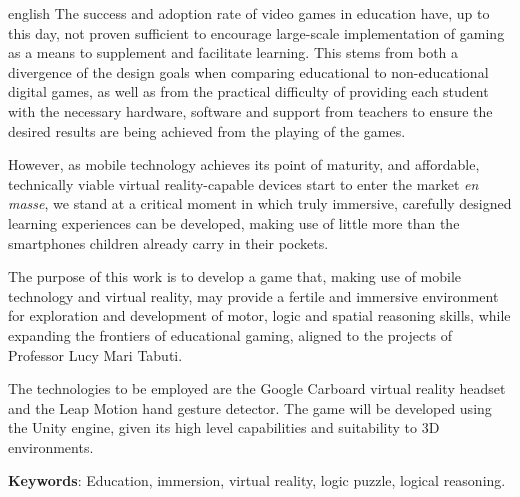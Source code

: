 \begin{resumo}[Abstract]
 \begin{otherlanguage*}{english}
   The success and adoption rate of video games in education 
   have, up to this day, not proven sufficient to encourage 
   large-scale implementation of gaming as a means to 
   supplement and facilitate learning. This stems from 
   both a divergence of the design goals when comparing 
   educational to non-educational digital games, as well 
   as from the practical difficulty of providing each student 
   with the necessary hardware, software and support from 
   teachers to ensure the desired results are being achieved 
   from the playing of the games.
   
   However, as mobile technology achieves its point of 
   maturity, and affordable, technically viable virtual 
   reality-capable devices start to enter the market \textit{en 
   masse}, we stand at a critical moment in which truly 
   immersive, carefully designed learning experiences 
   can be developed, making use of little more than the 
   smartphones children already carry in their pockets.
   
   The purpose of this work is to develop a game that, 
   making use of mobile technology and virtual reality, 
   may provide a fertile and immersive environment for 
   exploration and development of motor, logic and spatial 
   reasoning skills, while expanding the frontiers of 
   educational gaming, aligned to the projects of 
   Professor Lucy Mari Tabuti.
   
   The technologies to be employed are the 
   Google Carboard virtual reality headset and the 
   Leap Motion hand gesture detector. The game will be 
   developed using the Unity engine, given its high level 
   capabilities and suitability to 3D environments.

    \vspace{\onelineskip}

    \noindent
    \textbf{Keywords}: Education, immersion, virtual reality, logic puzzle, logical reasoning.
  \end{otherlanguage*}
\end{resumo}